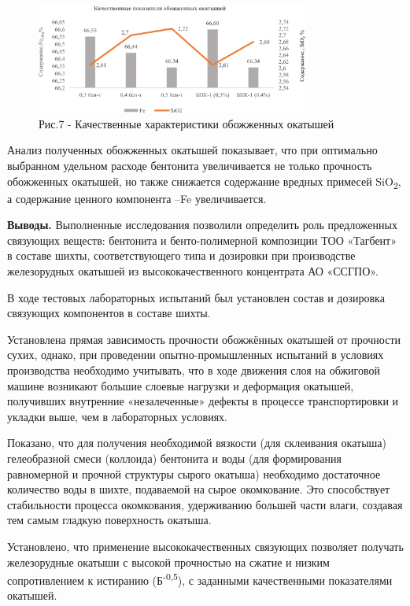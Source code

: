\begin{figure}[H]
	\centering
	\includegraphics[width=0.8\textwidth]{media/chem4/image9}
	\caption*{Рис.7 - Качественные характеристики обожженных окатышей}
\end{figure}

\begin{multicols}{2}
Анализ полученных обожженных окатышей показывает, что при оптимально
выбранном удельном расходе бентонита увеличивается не только прочность
обожженных окатышей, но также снижается содержание вредных примесей
SiO\textsubscript{2}, а содержание ценного компонента --Fe
увеличивается.

{\bfseries Выводы.} Выполненные исследования позволили определить роль
предложенных связующих веществ: бентонита и бенто-полимерной композиции
ТОО «Тагбент» в составе шихты, соответствующего типа и дозировки при
производстве железорудных окатышей из высококачественного концентрата АО
«ССГПО».

В ходе тестовых лабораторных испытаний был установлен состав и дозировка
связующих компонентов в составе шихты.

Установлена прямая зависимость прочности обожжённых окатышей от
прочности сухих, однако, при проведении опытно-промышленных испытаний в
условиях производства необходимо учитывать, что в ходе движения слоя на
обжиговой машине возникают большие слоевые нагрузки и деформация
окатышей, получивших внутренние «незалеченные» дефекты в процессе
транспортировки и укладки выше, чем в лабораторных условиях.

Показано, что для получения необходимой вязкости (для склеивания
окатыша) гелеобразной смеси (коллоида) бентонита и воды (для
формирования равномерной и прочной структуры сырого окатыша) необходимо
достаточное количество воды в шихте, подаваемой на сырое окомкование.
Это способствует стабильности процесса окомкования, удерживанию большей
части влаги, создавая тем самым гладкую поверхность окатыша.

Установлено, что применение высококачественных связующих позволяет
получать железорудные окатыши с высокой прочностью на сжатие и низким
сопротивлением к истиранию (Б\textsuperscript{-0,5}), с заданными
качественными показателями окатышей.
\end{multicols}

